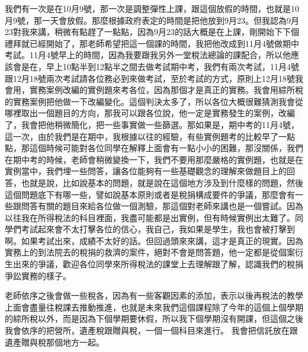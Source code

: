 \documentclass[]{ctexbook}
\begin{document}
我們有一次是在10月9號，那一次是調整彈性上課，跟這個放假的時間，也就是10月9號，那一天會放假。那麼根據政府表定的時間是把他放到9月23。但我認為9月23對我來講，稍微有點趕了一點點，因為9月23的話大概是在上課，剛開始下下個禮拜就已經開始了，那老師希望把這一個課的時間，我把他改成到11月4號做期中考試。11月4號早上的時間，因為我要跟我另外一堂稅法總論的課配合，所以他應該會是在，早上10點半到12點半之間去做考試期中考，我們有兩次考試，11月4號跟12月18號兩次考試請各位務必到來做考試，至於考試的方式，原則上12月18號我會用，實務案例改編的實例題來考各位，因為那個才是真正的實務。我會用綜所稅的實務案例把他做一下改編變化。這個判決太多了，所以各位大概很難猜測我會從哪裡取出一個題目的方向，那我可以跟各位說，他一定是實務發生的案例，改編了，我會把他稍微簡化，把一些事實做一些篩選。那如果是，期中考的11月4號，這一次，由於我們是在期中，我根據以往的經驗，有些實例題考的比較早了一點點，那這個時候可能對各位同學在解釋上面會有一點小小的困難，那沒關係，我們在期中考的時候，老師會稍微變換一下，我們不要用那麼嚴格的實例題，也就是在實例當中，我們埋一些問答，讓各位能夠有一些基礎觀念的理解來做題目上的回答，也就是說，比如說基本的問題，就是說在這個地方涉及到什麼樣的問題，然後這個問題底下有哪一些，譬如說基本原則或者是稅捐構成要件的爭議，那麼會有一些跟問答有關的題目來給各位做一個測驗，那這個對老師來講也是一個嘗試。因為以往我在所得稅法的科目裡面，我盡可能都是出實例，但有時候實例出太難了。同學們考試起來會不太打擊各位的信心，我自己，我如果是學生，我也會被打擊到啊。如果考試出來，成績不太好的話。但回過頭來來講，這才是真正的現實。因為實務上的到法院去的稅捐的救濟的案件，絕對不會是問答題，他一定都是從個案衍生出來的爭議，歡迎各位同學來所得稅法的課堂上去理解跟了解，認識我們的稅捐爭訟實務的樣子。

老師依序之後會做一些稅各，因為有一些客觀因素的添加，表示以後再稅法的教學上面會盡量往稅課去推動推進，也就是未來我們這個課程除了今年的這個上個學期的綜所稅以外，而是因為下個學期要休假，所以我下個學期沒有開課，但這個之後我會依序的把營所，遺產稅跟贈與稅，一個一個科目來進行。
我會把信託放在跟遺產贈與稅那個地方一起。
\end{document}
